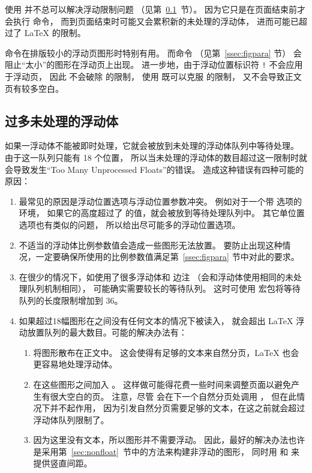 \begin{description}
	使用  并不总可以解决浮动限制问题
	（见第~\ref{ssec:toomanyfig}~节）。
	因为它只是在页面结束前才会执行  命令，
	而到页面结束时可能又会累积新的未处理的浮动体，
	进而可能已超过了 \LaTeX{} 的限制。
	
	 命令在排版较小的浮动页图形时特别有用。
	而命令  （见第~\ref{ssec:figpara} 节）
	会阻止“太小”的图形在浮动页上出现。
	进一步地，由于浮动位置标识符 \texttt{!} 	不会应用于浮动页，
	因此 \opt{[!p]} 不会破除  的限制，
	使用  既可以克服  的限制，
	又不会导致正文页有较多空白。
\end{description}


\subsection{过多未处理的浮动体}\label{ssec:toomanyfig}

如果一浮动体不能被即时处理，它就会被放到未处理的浮动体队列中等待处理。
由于这一队列只能有 18 个位置，
所以当未处理的浮动体的数目超过这一限制时就会导致发生“Too Many Unprocessed Floats”的错误。
造成这种错误有四种可能的原因：

\begin{enumerate}
	\item 最常见的原因是浮动位置选项与浮动位置参数冲突。
	例如对于一个带 \opt{[t]} 选项的  环境，
	如果它的高度超过了  的值，就会被放到等待处理队列中。
	其它单位置选项也有类似的问题，
	所以给出尽可能多的浮动位置选项。

	\item 不适当的浮动体比例参数值会造成一些图形无法放置。
	要防止出现这种情况，一定要确保所使用的比例参数值满足第~\ref{ssec:figpara} 节中对此的要求。

	\item 在很少的情况下，如使用了很多浮动体和  边注
	（会和浮动体使用相同的未处理队列机制相同），
	可能确实需要较长的等待队列。
	这时可使用  宏包将等待队列的长度限制增加到 36。

	\item 如果超过18幅图形在之间没有任何文本的情况下被读入，
	就会超出 \LaTeX{} 浮动放置队列的最大数目。可能的解决办法有：
	
	\begin{enumerate}
		\item 将图形散布在正文中。
		这会使得有足够的文本来自然分页，\LaTeX{} 也会更容易地处理浮动体。
		\item 在这些图形之间加入 。
		这样做可能得花费一些时间来调整页面以避免产生有很大空白的页。
		注意，尽管  会在下一个自然分页处调用 ，
		但在此情况下并不起作用，
		因为引发自然分页需要足够的文本，在这之前就会超过浮动体队列限制了。
		\item 因为这里没有文本，所以图形并不需要浮动。
		因此，最好的解决办法也许是采用第~\ref{sec:nonfloat}~节中的方法来构建非浮动的图形，
		同时用  和  来提供竖直间距。
	\end{enumerate}
\end{enumerate}


